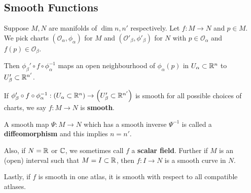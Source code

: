 
\subsection{Smooth Functions}


Suppose $M,N$ are manifolds of $\dim n, n'$ respectively. Let $f : M \to N$ and $p \in M$. We pick charts $\left( \mathcal{O}_\alpha, \phi_\alpha \right) $ for $M$ and $\left( \mathcal{O}'_{\beta}, \phi'_\beta \right) $ for $N$ with $p \in \mathcal{O}_\alpha$ and $f\left( p \right) \in \mathcal{O}_\beta$.

Then $\phi_\beta' \circ f \circ \phi_{\alpha}^{-1}$ maps an open neighbourhood of $\phi_\alpha \left( p \right) $ in $U_{\alpha} \subset \mathbb{R}^{n}$ to $U_{\beta}' \subset \mathbb{R}^{n'}$.

\begin{definition}
    If $\phi_\beta' \circ f \circ \phi_{\alpha}^{-1} : \left( U_{\alpha} \subset \mathbb{R}^{n} \right) \to \left( U'_{\beta} \subset \mathbb{R}^{n'} \right)  $ is smooth for all possible choices of charts, we say $f : M \to N$ is \textbf{smooth}.
\end{definition}

\begin{note}
    A smooth map $\Psi : M \to N$ which has a smooth inverse $\Psi^{-1}$ is called a \textbf{diffeomorphism} and this implies $n = n'$.

    Also, if $N = \mathbb{R}$ or $\mathbb{C}$, we sometimes call $f$ a \textbf{scalar field}. Further if $M$ is an (open) interval such that $M = I \subset \mathbb{R}$, then $f : I \to N$ is a smooth curve in $N$.

    Lastly, if $f$ is smooth in one atlas, it is smooth with respect to all compatible atlases.
\end{note}

